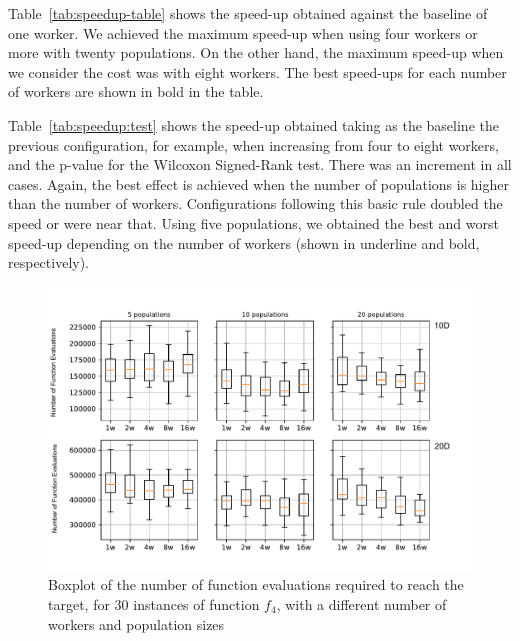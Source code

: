 \documentclass[review]{elsarticle}
\begin{document}
Table~\ref{tab:speedup-table} shows the speed-up obtained against the baseline of
one worker. We achieved the maximum speed-up when using four workers or more with
twenty populations. On the other hand, the maximum speed-up when we consider the
cost was with eight workers. The best speed-ups for each number of workers are
shown in bold in the table.  



Table~\ref{tab:speedup:test} shows the speed-up obtained taking as the baseline
the previous configuration, for example, when increasing from four to eight
workers, and the p-value for the Wilcoxon Signed-Rank test. There was an
increment in all cases. Again, the best effect is achieved when the number of
populations is higher than the number of workers. Configurations following this
basic rule doubled the speed or were near that. Using five populations, we
obtained the best and worst speed-up depending on the number of workers (shown in
underline and bold, respectively).




\begin{figure}[h!tbp]
  \centering
  \includegraphics[width=\textwidth]{evals_per_instance}
  \caption{Boxplot of the number of function evaluations required to reach the target, for 30 instances of function $f_4$, with a different number of workers and population sizes}
  \label{fig:evals_instance}
\end{figure}




\end{document}

